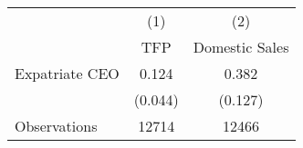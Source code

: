 \begin{tabular}{l*{2}{c}}
\hline\hline
                    &\multicolumn{1}{c}{(1)}&\multicolumn{1}{c}{(2)}\\
                    &\multicolumn{1}{c}{TFP}&\multicolumn{1}{c}{Domestic Sales}\\
\hline
Expatriate CEO      &       0.124&       0.382\\
                    &     (0.044)&     (0.127)\\
\hline
Observations        &       12714&       12466\\
\hline\hline
\end{tabular}

